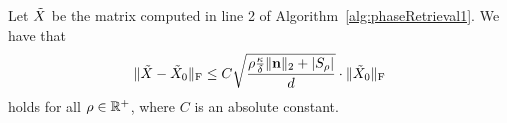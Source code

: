 
\begin{lemma}
Let $\tilde{X}$ be the matrix computed in line 2 of Algorithm~\ref{alg:phaseRetrieval1}.  We have that $$\| \tilde{X} - \tilde{X}_0 \|_{\rm F} \leq C \sqrt{\frac{\rho \frac{\kappa}{\delta} \| \mathbf n \|_2 + \left| S_\rho \right|}{d}} \cdot \| \tilde{X}_0 \|_{\rm F}$$
holds for all $\rho \in \mathbb{R}^+$, where $C$ is an absolute constant.
\label{lem:EtaBound}
\end{lemma}

